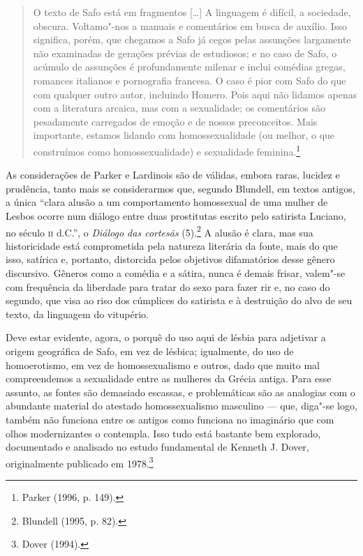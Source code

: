 \begin{quote}
O texto de Safo está em fragmentos [\ldots{}] A linguagem é difícil, a sociedade,
obscura. Voltamo"-nos a manuais e comentários em busca de auxílio. Isso
significa, porém, que chegamos a Safo já cegos pelas assunções largamente não
examinadas de gerações prévias de estudiosos; e no caso de Safo, o acúmulo de
assunções é profundamente milenar e inclui comédias gregas, romances italianos
e pornografia francesa. O caso é pior com Safo do que com qualquer outro autor,
incluindo Homero. Pois aqui não lidamos apenas com a literatura arcaica, mas
com a sexualidade; os comentários são pesadamente carregados de emoção e de
nossos preconceitos. Mais importante, estamos lidando com homossexualidade (ou
melhor, o que construímos como homossexualidade) e sexualidade feminina.\footnote{ Parker (1996, p. 149).}
\end{quote}

As considerações de Parker e Lardinois são de válidas, embora raras, lucidez e
prudência, tanto mais se considerarmos que, segundo Blundell, em
textos antigos, a única “clara alusão a um comportamento homossexual de uma
mulher de Lesbos ocorre num diálogo entre duas prostitutas escrito pelo
satirista Luciano, no século \textsc{ii} d.C.”, o \textit{Diálogo das cortesãs}
(5).\footnote{ Blundell (1995, p. 82).} A
alusão é clara, mas sua historicidade está comprometida pela natureza
literária da fonte, mais do que isso, satírica e, portanto, distorcida pelos objetivos difamatórios desse gênero discursivo. Gêneros como a
comédia e a sátira, nunca é demais frisar, valem"-se com frequência da liberdade
para tratar do sexo para fazer rir e, no caso do segundo, que visa ao riso dos
cúmplices do satirista e à destruição do alvo de seu texto, da linguagem do
vitupério. 

Deve estar evidente, agora, o porquê do uso aqui de lésbia para adjetivar a origem geográfica de Safo, em vez de lésbica; igualmente, do uso de homoerotismo, em vez de homossexualismo e outros, dado que muito mal compreendemos a sexualidade entre as mulheres da Grécia antiga. Para esse assunto, as fontes são demasiado escassas, e problemáticas são as analogias
com o abundante material do atestado homossexualismo masculino --- que,
diga"-se logo, também não funciona entre os antigos como funciona no imaginário
que com olhos modernizantes o contempla. Isso tudo está bastante
bem explorado, documentado e analisado no estudo fundamental de Kenneth J.
Dover, originalmente publicado em 1978.\footnote{ Dover (1994).}

